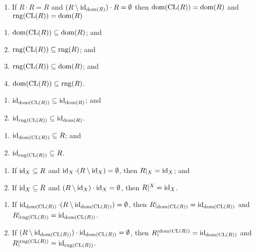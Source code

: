 \documentclass{article}
\begin{document}
\begin{thm}
\begin{enumerate}[label=(\roman*)]
  \item If $R\cdot R=R$ and $(R\setminus\id_{\dom(R)})\cdot R=\emptyset$
    then $\dom(\CL(R))=\dom(R)$ and $\rng(\CL(R))=\dom(R)$
  \end{enumerate}
\item\label{sysrel:32} 
  \begin{enumerate}[label=(\roman*)]
  \item $\dom(\CL(R))\subset\dom(R)$; and
  \item $\rng(\CL(R))\subset\rng(R)$; and
  \item $\rng(\CL(R))\subset\dom(R)$; and
  \item $\dom(\CL(R))\subset\rng(R)$.
  \end{enumerate}
\item\label{sysrel:33} 
  \begin{enumerate}[label=(\roman*)]
  \item $\id_{\dom(\CL(R))}\subset\id_{\dom(R)}$; and
  \item $\id_{\rng(\CL(R))}\subset\id_{\dom(R)}$.
  \end{enumerate}
\item\label{sysrel:34} 
  \begin{enumerate}[label=(\roman*)]
  \item $\id_{\dom(\CL(R))}\subset R$; and
  \item $\id_{\rng(\CL(R))}\subset R$.
  \end{enumerate}
\item\label{sysrel:35} 
  \begin{enumerate}[label=(\roman*)]
  \item If $\id_{X}\subset R$ and
    $\id_{X}\cdot(R\setminus\id_{X})=\emptyset$,
    then $R|_{X}=\id_{X}$; and
  \item If $\id_{X}\subset R$ and $(R\setminus\id_{X})\cdot\id_{X}=\emptyset$,
    then $R|^{X}=\id_{X}$.
  \end{enumerate}
\item\label{sysrel:36} 
  \begin{enumerate}[label=(\roman*)]
  \item If $\id_{\dom(\CL(R))}\cdot(R\setminus\id_{\dom(\CL(R))})=\emptyset$,
    then $R|_{\dom(\CL(R))}=\id_{\dom(\CL(R))}$ and $R|_{\rng(\CL(R))}=\id_{\dom(\CL(R))}$.
  \item If $(R\setminus\id_{\dom(\CL(R))})\cdot\id_{\dom(\CL(R))} =\emptyset$,
    then $R|^{\dom(\CL(R))}=\id_{\dom(\CL(R))}$ and $R|^{\rng(\CL(R))}=\id_{\rng(\CL(R))}$.
  \end{enumerate}

\end{thm}
\end{document}
